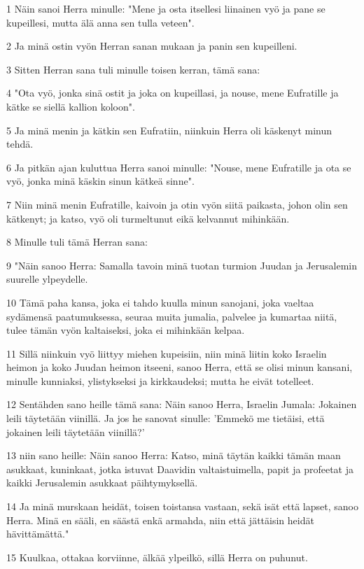 \par 1 Näin sanoi Herra minulle: "Mene ja osta itsellesi liinainen vyö ja pane se kupeillesi, mutta älä anna sen tulla veteen".
\par 2 Ja minä ostin vyön Herran sanan mukaan ja panin sen kupeilleni.
\par 3 Sitten Herran sana tuli minulle toisen kerran, tämä sana:
\par 4 "Ota vyö, jonka sinä ostit ja joka on kupeillasi, ja nouse, mene Eufratille ja kätke se siellä kallion koloon".
\par 5 Ja minä menin ja kätkin sen Eufratiin, niinkuin Herra oli käskenyt minun tehdä.
\par 6 Ja pitkän ajan kuluttua Herra sanoi minulle: "Nouse, mene Eufratille ja ota se vyö, jonka minä käskin sinun kätkeä sinne".
\par 7 Niin minä menin Eufratille, kaivoin ja otin vyön siitä paikasta, johon olin sen kätkenyt; ja katso, vyö oli turmeltunut eikä kelvannut mihinkään.
\par 8 Minulle tuli tämä Herran sana:
\par 9 "Näin sanoo Herra: Samalla tavoin minä tuotan turmion Juudan ja Jerusalemin suurelle ylpeydelle.
\par 10 Tämä paha kansa, joka ei tahdo kuulla minun sanojani, joka vaeltaa sydämensä paatumuksessa, seuraa muita jumalia, palvelee ja kumartaa niitä, tulee tämän vyön kaltaiseksi, joka ei mihinkään kelpaa.
\par 11 Sillä niinkuin vyö liittyy miehen kupeisiin, niin minä liitin koko Israelin heimon ja koko Juudan heimon itseeni, sanoo Herra, että se olisi minun kansani, minulle kunniaksi, ylistykseksi ja kirkkaudeksi; mutta he eivät totelleet.
\par 12 Sentähden sano heille tämä sana: Näin sanoo Herra, Israelin Jumala: Jokainen leili täytetään viinillä. Ja jos he sanovat sinulle: 'Emmekö me tietäisi, että jokainen leili täytetään viinillä?'
\par 13 niin sano heille: Näin sanoo Herra: Katso, minä täytän kaikki tämän maan asukkaat, kuninkaat, jotka istuvat Daavidin valtaistuimella, papit ja profeetat ja kaikki Jerusalemin asukkaat päihtymyksellä.
\par 14 Ja minä murskaan heidät, toisen toistansa vastaan, sekä isät että lapset, sanoo Herra. Minä en sääli, en säästä enkä armahda, niin että jättäisin heidät hävittämättä."
\par 15 Kuulkaa, ottakaa korviinne, älkää ylpeilkö, sillä Herra on puhunut.
